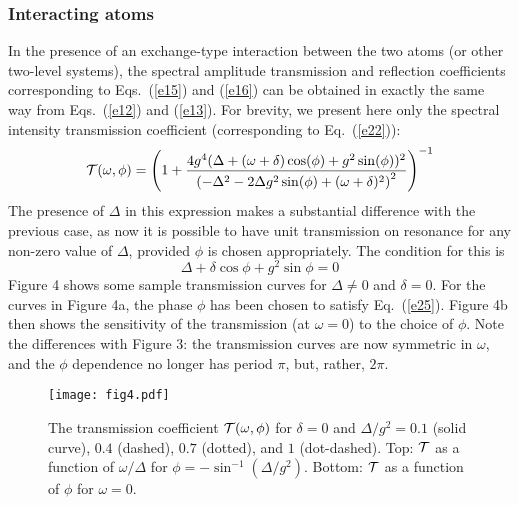\documentclass[aps,pra,twocolumn,floatfix,superscriptaddress]{revtex4}
\begin{document}
\subsubsection{Interacting atoms}
In the presence of an exchange-type interaction between the two atoms (or other two-level systems), the  spectral amplitude transmission and reflection coefficients corresponding to Eqs.~(\ref{e15}) and (\ref{e16}) can be obtained in exactly the same way from Eqs.~(\ref{e12}) and (\ref{e13}).  For brevity, we present here only the spectral intensity transmission coefficient (corresponding to Eq.~(\ref{e22})):
\begin{equation}
{\cal T}(\omega,\phi) =\left(1+\frac{4 g^4(\Delta +(\omega+\delta)  \cos (\phi )+g^2\sin (\phi
   ))^2}{\left(-\Delta ^2-2 \Delta g^2 \sin (\phi )+(\omega+\delta) ^2\right)^2} \right)^{-1}
\label{e24}
\end{equation}
The presence of $\Delta$ in this expression makes a substantial difference with the previous case, as now it is possible to have unit transmission on resonance for any non-zero value of $\Delta$, provided $\phi$ is chosen appropriately.  
The  condition for this is
\begin{equation}
\Delta + \delta\cos\phi + g^2\sin\phi = 0
\label{e25}
\end{equation}
Figure 4 shows some sample transmission curves for $\Delta\ne 0$ and $\delta =0$.  For the curves in Figure 4a, the phase $\phi$ has been chosen to satisfy Eq.~(\ref{e25}).  Figure 4b then shows the sensitivity of the transmission (at $\omega=0$) to the choice of $\phi$.  Note the differences with Figure 3: the transmission curves are now symmetric in $\omega$, and the $\phi$ dependence no longer has period $\pi$, but, rather, $2\pi$.

\begin{figure}
\texttt{[image: fig4.pdf]}
\caption{\label{fig3} The transmission coefficient ${\cal T}(\omega,\phi)$ for $\delta=0$ and $\Delta/g^2 = 0.1$ (solid curve), $0.4$ (dashed), $0.7$ (dotted), and $1$ (dot-dashed).  Top: ${\cal T}$ as a function of $\omega/\Delta$ for $\phi = -\sin^{-1}(\Delta/g^2)$.  Bottom: ${\cal T}$ as a function of $\phi$ for $\omega=0$. }
\end{figure}
\end{document}
